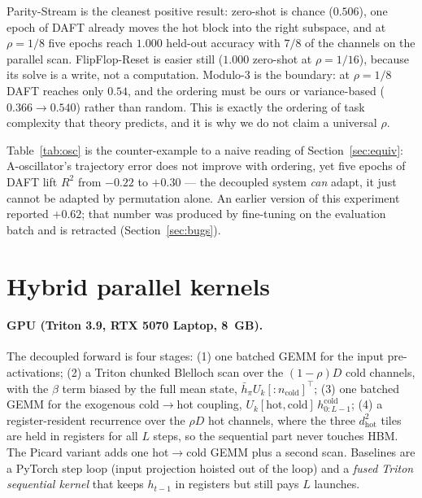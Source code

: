\documentclass[11pt]{article}
\theoremstyle{definition}
\begin{document}
\begin{table}[H]
\centering
\caption{Non-$TC^0$ suite, $D=256$, $L=256$ evaluated on unseen sequences. ``Zero-shot'' applies the
jacobian/variance/random ordering to the trained full-CfC weights without any gradient step; ``DAFT'' is five
epochs of decoupling-aware fine-tuning (gradients masked to the hot block, lr $10^{-3}$).}
\label{tab:expr}
\small

\end{table}

Parity-Stream is the cleanest positive result: zero-shot is chance ($0.506$), one epoch of DAFT already moves
the hot block into the right subspace, and at $\rho=1/8$ five epochs reach $1.000$ held-out accuracy with
$7/8$ of the channels on the parallel scan. FlipFlop-Reset is easier still ($1.000$ zero-shot at $\rho=1/16$),
because its solve is a write, not a computation. Modulo-3 is the boundary: at $\rho=1/8$ DAFT reaches only
$0.54$, and the ordering must be ours or variance-based ($0.366\to0.540$) rather than random. This is exactly
the ordering of task complexity that theory predicts, and it is why we do not claim a universal $\rho$.

\begin{table}[H]
\centering
\caption{A-oscillator recovery under DAFT (fine-tuned on \emph{fresh} sequences, evaluated on the held-out
batch).}
\label{tab:osc}
\small

\end{table}

Table~\ref{tab:osc} is the counter-example to a naive reading of Section~\ref{sec:equiv}: A-oscillator's
trajectory error does not improve with ordering, yet five epochs of DAFT lift $R^2$ from $-0.22$ to
$+0.30$ --- the decoupled system \emph{can} adapt, it just cannot be adapted by permutation alone. An earlier
version of this experiment reported $+0.62$; that number was produced by fine-tuning on the evaluation batch
and is retracted (Section~\ref{sec:bugs}).

\section{Hybrid parallel kernels}\label{sec:kernels}

\paragraph{GPU (Triton 3.9, RTX 5070 Laptop, 8~GB).} The decoupled forward is four stages: (1) one batched GEMM
for the input pre-activations; (2) a Triton chunked Blelloch scan over the $(1-\rho)D$ cold channels, with the
$\beta$ term biased by the full mean state, $\bar h_\pi U_{k}[:n_{\text{cold}}]^\top$; (3) one batched GEMM for
the exogenous cold$\to$hot coupling, $U_{k}[\text{hot},\text{cold}]\,h^{\text{cold}}_{0:L-1}$; (4) a
register-resident recurrence over the $\rho D$ hot channels, where the three $d_{\text{hot}}^2$ tiles are held
in registers for all $L$ steps, so the sequential part never touches HBM. The Picard variant adds one hot$\to$cold
GEMM plus a second scan. Baselines are a PyTorch step loop (input projection hoisted out of the loop) and a
\emph{fused Triton sequential kernel} that keeps $h_{t-1}$ in registers but still pays $L$ launches.
\end{document}
